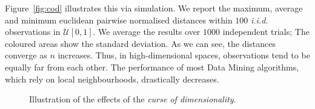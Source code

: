Figure~\ref{fig:cod} illustrates this via simulation. We report the maximum, average and minimum euclidean pairwise normalised distances within $100$ \textit{i.i.d.} observations in $\mathcal{U}[0,1]$. We average the results over $1000$ independent trials; The coloured areas show the standard deviation. As we can see, the distances converge as $n$ increases. Thus, in high-dimensional spaces, observations tend to be equally far from each other. The performance of most Data Mining algorithms, which rely on local neighbourhoods, drastically decreases.  

\begin{figure}
	\centering
	\hfill
	\hfill
	\caption{Illustration of the effects of the \textit{curse of dimensionality}.}
	\label{fig:searchspace}
\end{figure}

